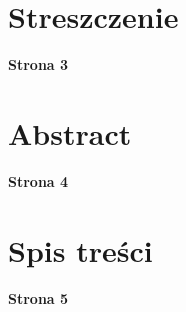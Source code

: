 \documentclass[10pt, a4paper, twoside, onecolumn]{article}
\numberwithin{equation}{section}
\begin{document}
	\section*{Streszczenie}
	\begin{center}
		\textbf{Strona 3}
	\end{center}
	\pagebreak
	
	\section*{Abstract}
	\begin{center}
		\textbf{Strona 4}
	\end{center}
	\pagebreak
	
	\section*{Spis treści}
	\begin{center}
		\textbf{Strona 5}
	\end{center}
	\tableofcontents
	\pagebreak
	
\end{document}
